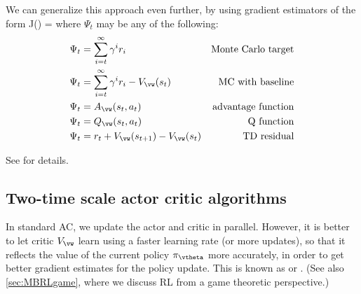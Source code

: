 We can generalize this approach even further,
by using gradient estimators of the form
\be
\nabla J(\vtheta) = 
\ee
where $\Psi_t$ may be any of the following:
\begin{align}
  \Psi_t &=  \sum_{i=t}^{\infty} \gamma^i r_i
  & \text{Monte Carlo target}\\
  \Psi_t &=  \sum_{i=t}^{\infty} \gamma^i r_i
  -V_{\vw}(s_t) & \text{MC with baseline}\\
  \Psi_t &= A_{\vw}(s_t,a_t) & \text{advantage function} \\
  \Psi_t &= Q_{\vw}(s_t,a_t) & \text{Q function} \\
  \Psi_t &= r_t + V_{\vw}(s_{t+1}) - V_{\vw}(s_t) & \text{TD residual}
  \end{align}

See \citep{GAE} for details.





\subsection{Two-time scale actor critic algorithms}
\label{sec:twoTimeScale}
\label{sec:bilevel}

In standard AC, we update the actor and critic in parallel.
However, it is better
to let critic $V_{\vw}$ learn
using a faster learning rate (or more updates),
so that it reflects the value of the current policy $\pi_{\vtheta}$
more accurately, in order to get better gradient estimates
for the policy update.
This is 
known as 
or 
\citep{Yu2017TD,Zhang2019timescale,Hong2023,Zheng2022AC,Lorraine2024}.
(See also \cref{sec:MBRLgame}, where we discuss RL
from a game theoretic perspective.)

